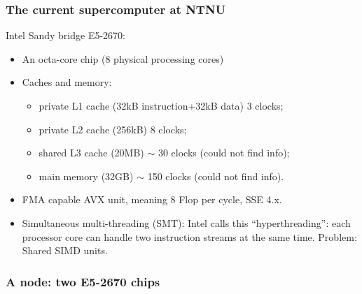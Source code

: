 \begin{frame}
  \frametitle{The current supercomputer at NTNU}
  Intel Sandy bridge E5-2670:
  \begin{itemize}
  \item An octa-core chip (8 physical processing cores)
  \item Caches and memory:
    \begin{itemize}
    \item private L1 cache (32kB instruction+32kB data) 3 clocks;
    \item private L2 cache (256kB) 8 clocks;
    \item shared L3 cache (20MB) $\sim$ 30 clocks (could not find info);
    \item main memory (32GB) $\sim$ 150 clocks (could not find info).
    \end{itemize}
  \item FMA capable AVX unit, meaning 8 Flop per cycle, SSE 4.x.
  \item Simultaneous multi-threading (SMT): Intel calls this ``hyperthreading'':
    each processor core can handle two instruction streams at the same time.
    Problem: Shared SIMD units.
  \end{itemize}
\end{frame}

\begin{frame}
  \frametitle{A node: two E5-2670 chips}
  \begin{center}
  \end{center}
\end{frame}

